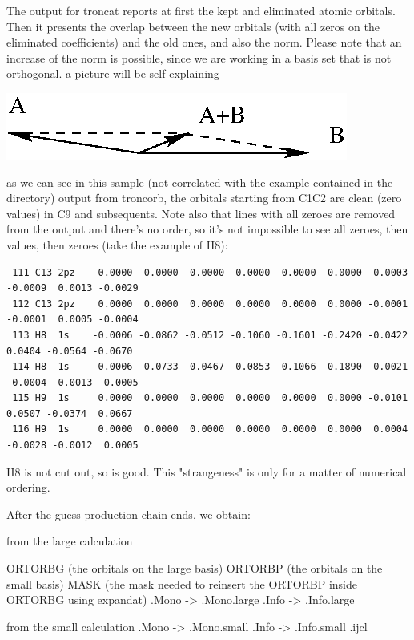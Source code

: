 \documentclass[a4paper,11pt]{report}
\begin{document}
The output for troncat reports at first the kept and eliminated atomic orbitals.
Then it presents the overlap between the new orbitals (with all zeros on the
eliminated coefficients) and the old ones, and also the norm. Please note
that an increase of the norm is possible, since we are working in a basis
set that is not orthogonal. a picture will be self explaining

\begin{center}
\includegraphics{vectors.eps}
\end{center}

as we can see in this sample (not correlated with the example contained in
the directory) output from troncorb, the orbitals starting from C1C2 are clean
(zero values) in C9 and subsequents. Note also that lines with all zeroes
are removed from the output and there's no order, so it's not impossible to
see all zeroes, then values, then zeroes (take the example of H8):

\begin{verbatim}
 111 C13 2pz    0.0000  0.0000  0.0000  0.0000  0.0000  0.0000  0.0003
-0.0009  0.0013 -0.0029
 112 C13 2pz    0.0000  0.0000  0.0000  0.0000  0.0000  0.0000 -0.0001
-0.0001  0.0005 -0.0004
 113 H8  1s    -0.0006 -0.0862 -0.0512 -0.1060 -0.1601 -0.2420 -0.0422
0.0404 -0.0564 -0.0670
 114 H8  1s    -0.0006 -0.0733 -0.0467 -0.0853 -0.1066 -0.1890  0.0021
-0.0004 -0.0013 -0.0005
 115 H9  1s     0.0000  0.0000  0.0000  0.0000  0.0000  0.0000 -0.0101
0.0507 -0.0374  0.0667
 116 H9  1s     0.0000  0.0000  0.0000  0.0000  0.0000  0.0000  0.0004
-0.0028 -0.0012  0.0005
\end{verbatim}

H8 is not cut out, so is good. This "strangeness" is only for a matter
of numerical ordering.

After the guess production chain ends, we obtain:

from the large calculation

ORTORBG (the orbitals on the large basis)
ORTORBP (the orbitals on the small basis)
MASK (the mask needed to reinsert the ORTORBP inside ORTORBG using expandat)
.Mono -> .Mono.large
.Info -> .Info.large

from the small calculation
.Mono -> .Mono.small
.Info -> .Info.small
.ijcl
\end{document}
